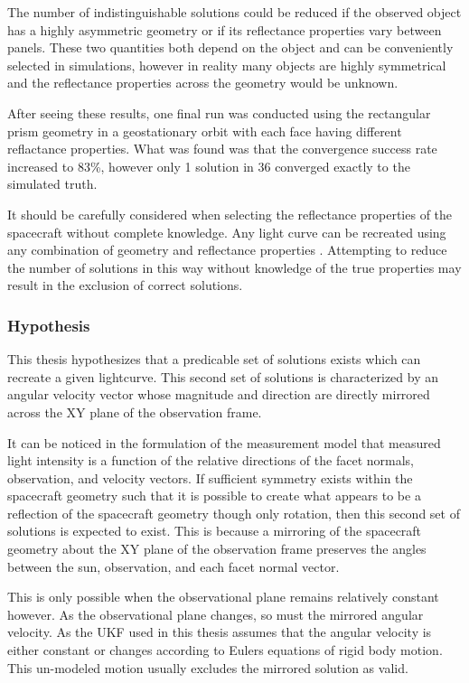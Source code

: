 The number of indistinguishable solutions could be reduced if the observed object has a highly asymmetric geometry or if its reflectance properties vary between panels. These two quantities both depend on the object and can be conveniently selected in simulations, however in reality many objects are highly symmetrical and the reflectance properties across the geometry would be unknown.

After seeing these results, one final run was conducted using the rectangular prism geometry in a geostationary orbit with each face having different reflactance properties. What was found was that the convergence success rate increased to 83\%, however only 1 solution in 36 converged exactly to the simulated truth.

It should be carefully considered when selecting the reflectance properties of the spacecraft without complete knowledge. Any light curve can be recreated using any combination of geometry and reflectance properties \cite{Spin_Direction}. Attempting to reduce the number of solutions in this way without knowledge of the true properties may result in the exclusion of correct solutions.

\subsubsection{Hypothesis}

This thesis hypothesizes that a predicable set of solutions exists which can recreate a given lightcurve. This second set of solutions is characterized by an angular velocity vector whose magnitude and direction are directly mirrored across the XY plane of the observation frame.

It can be noticed in the formulation of the measurement model that measured light intensity is a function of the relative directions of the facet normals, observation, and velocity vectors. If sufficient symmetry exists within the spacecraft geometry such that it is possible to create what appears to be a reflection of the spacecraft geometry though only rotation, then this second set of solutions is expected to exist. This is because a mirroring of the spacecraft geometry about the XY plane of the observation frame preserves the angles between the sun, observation, and each facet normal vector.

This is only possible when the observational plane remains relatively constant however. As the observational plane changes, so must the mirrored angular velocity. As the UKF used in this thesis assumes that the angular velocity is either constant or changes according to Eulers equations of rigid body motion. This un-modeled motion usually excludes the mirrored solution as valid.


